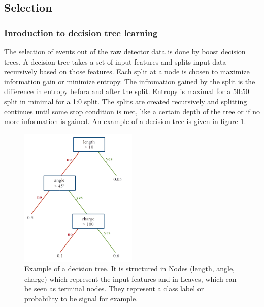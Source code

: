 \documentclass[english]{uzhpub}
\begin{document}

 \subsection{Selection} \label{sec:clas}

 \subsubsection{Inroduction to decision tree learning}

The selection of events out of the raw detector data is done by boost decision trees. A decision tree takes a set of input features and splits input data recursively based on those features. Each split at a node is chosen to maximize information gain or minimize entropy. The infromation gained by the split is the difference in entropy befora and after the split. Entropy is maximal for a 50:50 split in minimal for a 1:0 split.
The splits are created recursively and splitting continues until some stop condition is met, like a certain depth of the tree or if no more information is gained. An example of a decision tree is given in figure \ref{fig:tree}.

\begin{figure}[H]
 \centering
 \includegraphics[width=0.5\textwidth]{img/decision_tree}
 \caption{Example of a decision tree. It is structured in Nodes (length, angle, charge) which represent the input features and in Leaves, which can be seen as terminal nodes. They represent a class label or probability to be signal for example.}
 \label{fig:tree}
\end{figure}
\end{document}
